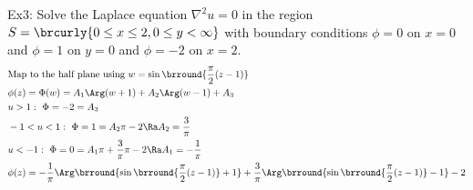Ex3: Solve the Laplace equation $\nabla^2u=0$ in the region $S=\brcurly{0\leq x\leq 2,0\leq y<\infty}$ with boundary conditions $\phi=0$ on $x=0$ and $\phi=1$ on $y=0$ and $\phi=-2$ on $x=2$.
\begin{align*}
    &\text{Map to the half plane using }w=\sin\brround{\frac{\pi}{2}(z-1)}\\
    &\phi(z)=\Phi(w)=A_1\Arg(w+1)+A_2\Arg(w-1)+A_3\\
    &u>1:\ \Phi=-2=A_3\\
    &-1<u<1:\ \Phi=1=A_2\pi-2\Ra A_2=\frac{3}{\pi}\\
    &u<-1:\ \Phi=0=A_1\pi+\frac{3}{\pi}\pi-2\Ra A_1=-\frac{1}{\pi}\\
    &\phi(z)=-\frac{1}{\pi}\Arg\brround{\sin\brround{\frac{\pi}{2}(z-1)}+1}+\frac{3}{\pi}\Arg\brround{\sin\brround{\frac{\pi}{2}(z-1)}-1}-2
\end{align*}

